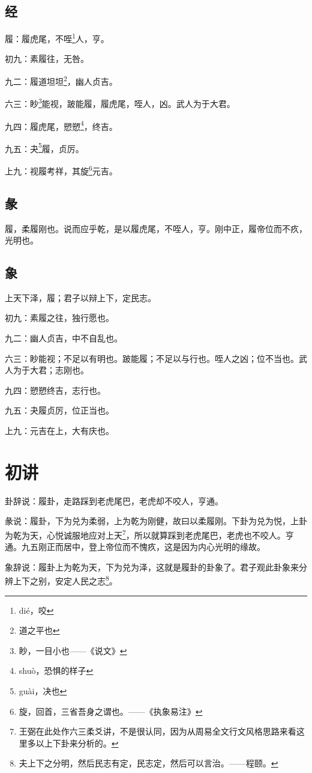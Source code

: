 \documentclass[12pt,oneside]{book}
\begin{document}
\subsection{经}
履：履虎尾，不咥\footnote{dié，咬}人，亨。

初九：素履往，无咎。

九二：履道坦坦\footnote{道之平也}，幽人贞吉。

六三：眇\footnote{眇，一目小也——《说文》}能视，跛能履，履虎尾，咥人，凶。武人为于大君。

九四：履虎尾，愬愬\footnote{shuò，恐惧的样子}，终吉。

九五：夬\footnote{guài，决也}履，贞厉。

上九：视履考祥，其旋\footnote{旋，回首，三省吾身之谓也。——《执象易注》}元吉。

\subsection{彖}
履，柔履刚也。说而应乎乾，是以履虎尾，不咥人，亨。刚中正，履帝位而不疚，光明也。

\subsection{象}
上天下泽，履；君子以辩上下，定民志。

初九：素履之往，独行愿也。

九二：幽人贞吉，中不自乱也。

六三：眇能视；不足以有明也。跛能履；不足以与行也。咥人之凶；位不当也。武人为于大君；志刚也。

九四：愬愬终吉，志行也。

九五：夬履贞厉，位正当也。

上九：元吉在上，大有庆也。

\section{初讲}
卦辞说：履卦，走路踩到老虎尾巴，老虎却不咬人，亨通。

彖说：履卦，下为兑为柔弱，上为乾为刚健，故曰以柔履刚。下卦为兑为悦，上卦为乾为天，心悦诚服地应对上天\footnote{王弼在此处作六三柔爻讲，不是很认同，因为从周易全文行文风格思路来看这里多以上下卦来分析的。}，所以就算踩到老虎尾巴，老虎也不咬人。亨通。九五刚正而居中，登上帝位而不愧疚，这是因为内心光明的缘故。

象辞说：履卦上为乾为天，下为兑为泽，这就是履卦的卦象了。君子观此卦象来分辨上下之别，安定人民之志\footnote{夫上下之分明，然后民志有定，民志定，然后可以言治。——程颐。}。
\end{document}
